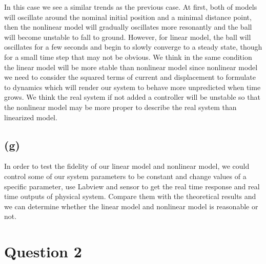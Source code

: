 \documentclass[letterpaper]{article}
\begin{document}
In this case we see a similar trends as the previous case. At first, both of models will oscillate around the nominal initial position and a minimal distance point, then the nonlinear model will gradually oscillates more resonantly and the ball will become unstable to fall to ground. However, for linear model, the ball will oscillates for a few seconds and begin to slowly converge to a steady state, though for a small time step that may not be obvious. We think in the same condition the linear model will be more stable than nonlinear model since nonlinear model we need to consider the squared terms of current and displacement to formulate to dynamics which will render our system to behave more unpredicted when time grows. We think the real system if not added a controller will be unstable so that the nonlinear model may be more proper to describe the real system than linearized model.
\subsection*{(g)}
In order to test the fidelity of our linear model and nonlinear model, we could control some of our system parameters to be constant and change values of a specific parameter, use Labview and sensor to get the real time response and real time outputs of physical system. Compare them with the theoretical results and we can determine whether the linear model and nonlinear model is reasonable or not.
\section*{Question 2}
\end{document}

